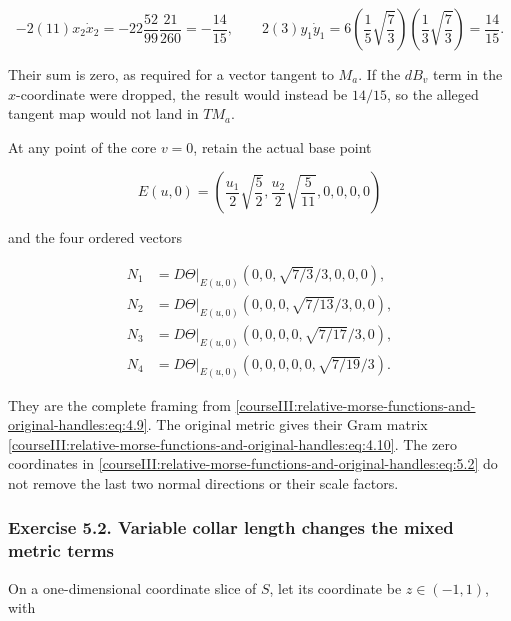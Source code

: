 \begin{equation}
-2(11)x_2\dot x_2
=-22\frac{52}{99}\frac{21}{260}
=-\frac{14}{15},
\qquad
2(3)y_1\dot y_1
=6\left(\frac15\sqrt{\frac73}\right)
   \left(\frac13\sqrt{\frac73}\right)
=\frac{14}{15}.
\label{courseIII:relative-morse-functions-and-original-handles:eq:5.5}
\end{equation}

Their sum is zero, as required for a vector tangent to \(M_a\). If the \(dB_v\) term in the \(x\)-coordinate were dropped, the result would instead be \(14/15\), so the alleged tangent map would not land in \(TM_a\).

At any point of the core \(v=0\), retain the actual base point

\[
E(u,0)=\left(\frac{u_1}{2}\sqrt{\frac52},
             \frac{u_2}{2}\sqrt{\frac5{11}},0,0,0,0\right)
\]

and the four ordered vectors

\begin{equation}
\begin{aligned}
N_1&=D\Theta|_{E(u,0)}(0,0,\sqrt{7/3}/3,0,0,0),\\
N_2&=D\Theta|_{E(u,0)}(0,0,0,\sqrt{7/13}/3,0,0),\\
N_3&=D\Theta|_{E(u,0)}(0,0,0,0,\sqrt{7/17}/3,0),\\
N_4&=D\Theta|_{E(u,0)}(0,0,0,0,0,\sqrt{7/19}/3).
\end{aligned}
\label{courseIII:relative-morse-functions-and-original-handles:eq:5.6}
\end{equation}

They are the complete framing from \eqref{courseIII:relative-morse-functions-and-original-handles:eq:4.9}. The original metric gives their Gram matrix \eqref{courseIII:relative-morse-functions-and-original-handles:eq:4.10}. The zero coordinates in \eqref{courseIII:relative-morse-functions-and-original-handles:eq:5.2} do not remove the last two normal directions or their scale factors.

\subsubsection{Exercise 5.2. Variable collar length changes the mixed metric terms}
\label{courseIII:relative-morse-functions-and-original-handles:exercise-5.2}

\label{courseIII:relative-morse:5.2}

On a one-dimensional coordinate slice of \(S\), let its coordinate be \(z\in(-1,1)\), with

